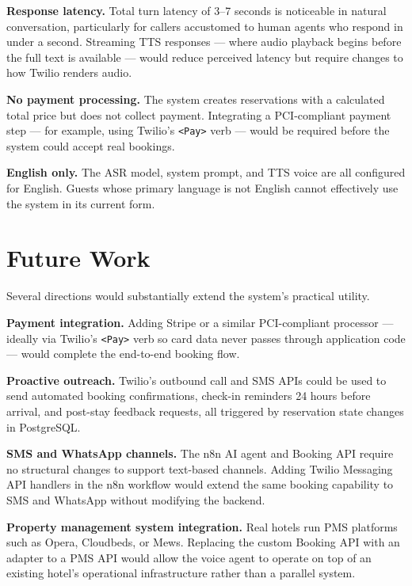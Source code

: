 \documentclass[conference]{IEEEtran}
\begin{document}
\textbf{Response latency.} Total turn latency of 3–7 seconds is noticeable
in natural conversation, particularly for callers accustomed to human agents
who respond in under a second. Streaming TTS responses — where audio playback
begins before the full text is available — would reduce perceived latency but
require changes to how Twilio renders audio.

\textbf{No payment processing.} The system creates reservations with a
calculated total price but does not collect payment. Integrating a PCI-compliant
payment step — for example, using Twilio's \texttt{<Pay>} verb — would be
required before the system could accept real bookings.

\textbf{English only.} The ASR model, system prompt, and TTS voice are all
configured for English. Guests whose primary language is not English cannot
effectively use the system in its current form.


\section{Future Work}
\label{sec:future}

Several directions would substantially extend the system's practical utility.

\textbf{Payment integration.} Adding Stripe or a similar PCI-compliant
processor — ideally via Twilio's \texttt{<Pay>} verb so card data never
passes through application code — would complete the end-to-end booking flow.

\textbf{Proactive outreach.} Twilio's outbound call and SMS APIs could
be used to send automated booking confirmations, check-in reminders 24 hours
before arrival, and post-stay feedback requests, all triggered by reservation
state changes in PostgreSQL.

\textbf{SMS and WhatsApp channels.} The n8n AI agent and Booking API require
no structural changes to support text-based channels. Adding Twilio Messaging
API handlers in the n8n workflow would extend the same booking capability to
SMS and WhatsApp without modifying the backend.

\textbf{Property management system integration.} Real hotels run PMS platforms
such as Opera, Cloudbeds, or Mews. Replacing the custom Booking API with an
adapter to a PMS API would allow the voice agent to operate on top of an
existing hotel's operational infrastructure rather than a parallel system.
\end{document}
